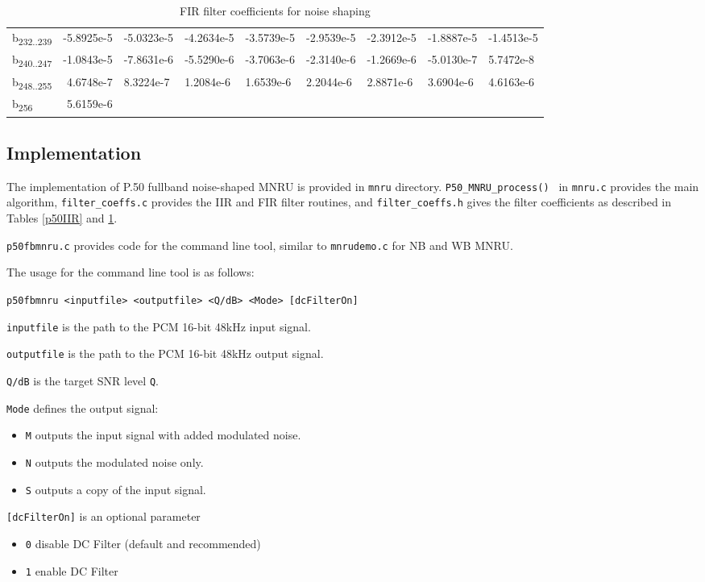 \begin{table}
{\begin{tabular}{lrlllllll}
        b\textsubscript{232..239} & -5.8925e-5 & -5.0323e-5 & -4.2634e-5 & -3.5739e-5 & -2.9539e-5 & -2.3912e-5 & -1.8887e-5 & -1.4513e-5 \\
        b\textsubscript{240..247} & -1.0843e-5 & -7.8631e-6 & -5.5290e-6 & -3.7063e-6 & -2.3140e-6 & -1.2669e-6 & -5.0130e-7 & 5.7472e-8 \\
        b\textsubscript{248..255} & 4.6748e-7 & 8.3224e-7 & 1.2084e-6 & 1.6539e-6 & 2.2044e-6 & 2.8871e-6 & 3.6904e-6 & 4.6163e-6 \\
        b\textsubscript{256} & 5.6159e-6 &  &  &  &  &  &  &  \\
    \end{tabular}}
    \caption{FIR filter coefficients for noise shaping}
    \label{p50FIR}
\end{table}

\subsection {Implementation}

The implementation of P.50 fullband noise-shaped MNRU is provided in {\tt mnru} directory.
{\tt P50\_MNRU\_process() } in {\tt mnru.c} provides the main algorithm,
{\tt filter\_coeffs.c} provides the IIR and FIR filter routines,
and {\tt filter\_coeffs.h} gives the filter coefficients as described in Tables \ref{p50IIR} and \ref{p50FIR}.

{\tt p50fbmnru.c} provides code for the command line tool, similar to {\tt mnrudemo.c} for NB and WB MNRU.

The usage for the command line tool is as follows:

{\tt p50fbmnru <inputfile> <outputfile> <Q/dB> <Mode> [dcFilterOn]}

{\tt inputfile} is the path to the PCM 16-bit 48kHz input signal.

{\tt outputfile} is the path to the PCM 16-bit 48kHz output signal.

{\tt Q/dB} is the target SNR level {\tt Q}.

{\tt Mode} defines the output signal:
\begin{itemize}
    \item {\tt M} outputs the input signal with added modulated noise.
    \item {\tt N} outputs the modulated noise only.
    \item {\tt S} outputs a copy of the input signal.
\end{itemize}

{\tt [dcFilterOn]} is an optional parameter
\begin{itemize}
    \item {\tt 0} disable DC Filter (default and recommended)
    \item {\tt 1} enable DC Filter
\end{itemize}


